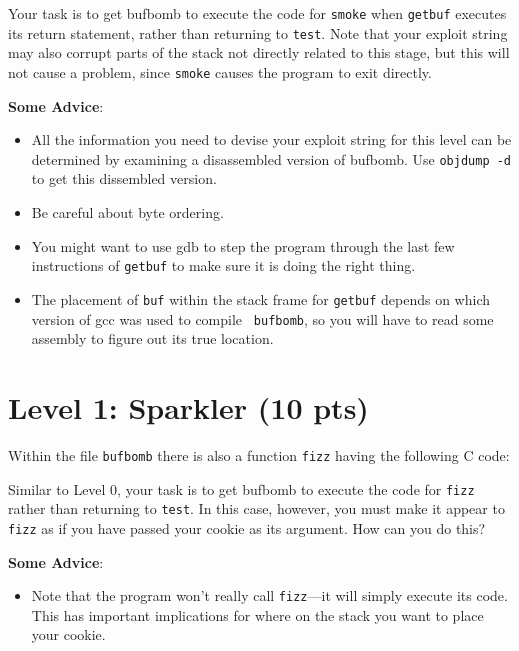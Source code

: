 \documentclass[11pt]{article}
\newenvironment{ccode}%
{\small}%
{}
\begin{document}
\begin{ccode}

\end{ccode}

Your task is to get {\sc bufbomb} to execute the code for {\tt smoke}
when {\tt getbuf} executes its return statement, rather than returning
to {\tt test}.  Note that your exploit string may also corrupt parts
of the stack not directly related to this stage, but this will not
cause a problem, since {\tt smoke} causes the program to exit
directly.


{\bf Some Advice}:
\begin{itemize}

\item All the information you need to devise your exploit string for
this level can be determined by examining a disassembled version of
{\sc bufbomb}. Use {\tt objdump -d} to get this dissembled version.

\item
Be careful about byte ordering.  

\item
You might want to use {\sc gdb} to step the program through the last
few instructions of {\tt getbuf} to make sure it is doing the right
thing.

\item
The placement of {\tt buf} within the stack frame for {\tt getbuf}
depends on which version of {\sc gcc} was used to compile {\tt
bufbomb}, so you will have to read some assembly to figure out its
true location. 
\end{itemize}


\section*{Level 1: Sparkler (10 pts)}

Within the file {\tt bufbomb} there is also a function {\tt fizz}
having the following C code:

\begin{ccode}

\end{ccode}

Similar to Level 0, your task is to get {\sc bufbomb} to execute the
code for {\tt fizz} rather than returning to {\tt test}.  In this
case, however, you must make it appear to {\tt fizz} as if you have
passed your cookie as its argument. How can you do this?


{\bf Some Advice}:
\begin{itemize}

\item Note that the program won't really call {\tt fizz}---it will
simply execute its code. This has important implications for where on
the stack you want to place your cookie.

\end{itemize}
\end{document}
